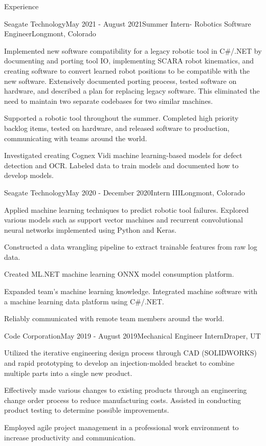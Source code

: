 \documentclass{resume}
\begin{document}
\begin{rSection}{Experience}
    \begin{rSubsection}{Seagate Technology}{May 2021 - August 2021}{Summer Intern- Robotics Software Engineer}{Longmont, Colorado}
    \item Implemented new software compatibility for a legacy robotic tool in  C\#/.NET by documenting and porting tool IO, implementing SCARA robot kinematics, and creating software to convert learned robot positions to be compatible with the new software. 
    Extensively documented porting process, tested software on hardware, and described a plan for replacing legacy software. 
    This eliminated the need to maintain two separate codebases for two similar machines.
    \item Supported a robotic tool throughout the summer. Completed high priority backlog items, tested on hardware, and released software to production, communicating with teams around the world.
    \item Investigated creating Cognex Vidi machine learning-based models for defect detection and OCR. Labeled data to train models and documented how to develop models.
    \end{rSubsection}
  
    \begin{rSubsection}{Seagate Technology}{May 2020 - December 2020}{Intern III}{Longmont, Colorado}
    \item Applied machine learning techniques to predict robotic tool failures. 
    Explored various models such as support vector machines and recurrent convolutional neural networks implemented using Python and Keras. 
    \item Constructed a data wrangling pipeline to extract trainable features from raw log data. 
    \item Created ML.NET machine learning ONNX model consumption platform.
    \item Expanded team’s machine learning knowledge. Integrated machine software with a machine learning data platform using C\#/.NET.
    \item Reliably communicated with remote team members around the world.
    \end{rSubsection}

    \begin{rSubsection}{Code Corporation}{May 2019 - August 2019}{Mechanical Engineer Intern}{Draper, UT}
    \item Utilized the iterative engineering design process through CAD (SOLIDWORKS) and rapid prototyping to develop an injection-molded bracket to combine multiple parts into a single new product.  
    \item Effectively made various changes to existing products through an engineering change order process to reduce manufacturing costs.  Assisted in conducting product testing to determine possible improvements.  
    \item Employed agile project management in a professional work environment to increase productivity and communication.
    \end{rSubsection}
 
  \end{rSection}
\end{document}
